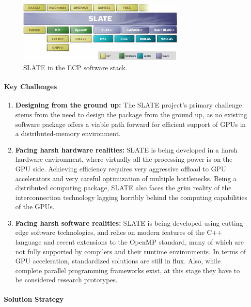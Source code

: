 \begin{figure}[htb]
    \centering
    \includegraphics[width=0.75\textwidth]{projects/2.3.3-MathLibs/2.3.3.13-CLOVER/SLATE-architecture.jpg}
    \caption{\label{fig:slate-architecture}
    SLATE in the ECP software stack.}
\end{figure}

\paragraph{Key  Challenges}

\begin{enumerate}
\item
\textbf{Designing from the ground up:}
The SLATE project's primary challenge stems from the need to design the package
from the ground up, as no existing software package offers
a viable path forward for efficient support of GPUs
in a distributed-memory environment.
\item
\textbf{Facing harsh hardware realities:}
SLATE is being developed in a harsh hardware environment, where virtually
all the processing power is on the GPU side.
Achieving efficiency requires very aggressive offload to GPU accelerators
and very careful optimization of multiple bottlenecks.
Being a distributed computing package, SLATE also faces the grim reality
of the interconnection technology lagging horribly behind the computing
capabilities of the GPUs.
\item
\textbf{Facing harsh software realities:}
SLATE is being developed using cutting-edge software technologies,
and relies on modern features of the C++ language and recent extensions
to the OpenMP standard, many of which are not fully supported by compilers
and their runtime environments.
In terms of GPU acceleration, standardized solutions are still in flux.
Also, while complete parallel programming frameworks exist, at this stage
they have to be considered research prototypes.
\end{enumerate}

\paragraph{Solution Strategy}

